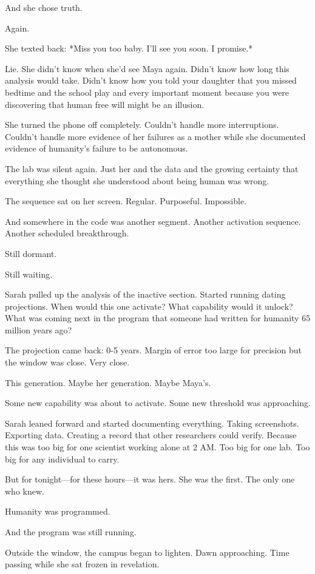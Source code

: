 And she chose truth.

Again.

She texted back: *Miss you too baby. I'll see you soon. I promise.*

Lie. She didn't know when she'd see Maya again. Didn't know how long this analysis would take. Didn't know how you told your daughter that you missed bedtime and the school play and every important moment because you were discovering that human free will might be an illusion.

She turned the phone off completely. Couldn't handle more interruptions. Couldn't handle more evidence of her failures as a mother while she documented evidence of humanity's failure to be autonomous.

The lab was silent again. Just her and the data and the growing certainty that everything she thought she understood about being human was wrong.

The sequence sat on her screen. Regular. Purposeful. Impossible.

And somewhere in the code was another segment. Another activation sequence. Another scheduled breakthrough.

Still dormant.

Still waiting.

Sarah pulled up the analysis of the inactive section. Started running dating projections. When would this one activate? What capability would it unlock? What was coming next in the program that someone had written for humanity 65 million years ago?

The projection came back: 0-5 years. Margin of error too large for precision but the window was close. Very close.

This generation. Maybe her generation. Maybe Maya's.

Some new capability was about to activate. Some new threshold was approaching.

Sarah leaned forward and started documenting everything. Taking screenshots. Exporting data. Creating a record that other researchers could verify. Because this was too big for one scientist working alone at 2 AM. Too big for one lab. Too big for any individual to carry.

But for tonight—for these hours—it was hers. She was the first. The only one who knew.

Humanity was programmed.

And the program was still running.

Outside the window, the campus began to lighten. Dawn approaching. Time passing while she sat frozen in revelation.

